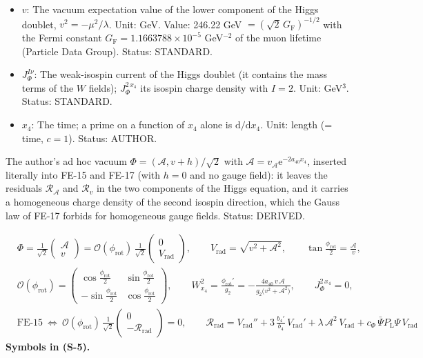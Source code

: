 \documentclass[
  10pt,
]{article}
\begin{document}
\begin{itemize}
\item
  \(v\): The vacuum expectation value of the lower component of the
  Higgs doublet, \(v^2 = -\mu^2/\lambda\). Unit: GeV. Value: 246.22 GeV
  \(= (\sqrt2\,G_{\mathrm{F}})^{-1/2}\) with the Fermi constant
  \(G_{\mathrm{F}} = 1.1663788\times10^{-5}\) GeV\(^{-2}\) of the muon
  lifetime (Particle Data Group). Status: STANDARD.
\item
  \(J_\Phi^{I\nu}\): The weak-isospin current of the Higgs doublet (it
  contains the mass terms of the \(W\) fields); \(J_\Phi^{2\,x_4}\) its
  isospin charge density with \(I = 2\). Unit: GeV\(^3\). Status:
  STANDARD.
\item
  \(x_4\): The time; a prime on a function of \(x_4\) alone is
  \(\mathrm{d}/\mathrm{d}x_4\). Unit: length (= time, \(c = 1\)).
  Status: AUTHOR.
\end{itemize}

The author's ad hoc vacuum \(\Phi = (\mathcal{A}, v + h)/\sqrt2\) with
\(\mathcal{A} = v_{\mathcal{A}}\mathrm{e}^{-2a_{40}x_4}\), inserted
literally into FE-15 and FE-17 (with \(h = 0\) and no gauge field): it
leaves the residuals \(\mathcal{R}_{\mathcal{A}}\) and \(\mathcal{R}_v\)
in the two components of the Higgs equation, and it carries a
homogeneous charge density of the second isospin direction, which the
Gauss law of FE-17 forbids for homogeneous gauge fields. Status:
DERIVED.

\[
\begin{aligned}
&\Phi = \frac{1}{\sqrt2}\begin{pmatrix}\mathcal{A}\\ v\end{pmatrix} = \mathcal{O}(\phi_{\mathrm{rot}})\,\frac{1}{\sqrt2}\begin{pmatrix}0\\ V_{\mathrm{rad}}\end{pmatrix},\qquad
 V_{\mathrm{rad}} = \sqrt{v^2 + \mathcal{A}^2},\qquad \tan\frac{\phi_{\mathrm{rot}}}{2} = \frac{\mathcal{A}}{v},\\
&\mathcal{O}(\phi_{\mathrm{rot}}) = \begin{pmatrix}\cos\frac{\phi_{\mathrm{rot}}}{2} & \sin\frac{\phi_{\mathrm{rot}}}{2}\\ -\sin\frac{\phi_{\mathrm{rot}}}{2} & \cos\frac{\phi_{\mathrm{rot}}}{2}\end{pmatrix},\qquad
 W^2_{x_4} = \frac{\phi_{\mathrm{rot}}'}{g_2} = -\frac{4a_{40}\,v\,\mathcal{A}}{g_2\big(v^2 + \mathcal{A}^2\big)},\qquad J_\Phi^{2\,x_4} = 0,\\
&\text{FE-15} \ \Leftrightarrow\ \mathcal{O}(\phi_{\mathrm{rot}})\,\frac{1}{\sqrt2}\begin{pmatrix}0\\ -\mathcal{R}_{\mathrm{rad}}\end{pmatrix} = 0,\qquad
 \mathcal{R}_{\mathrm{rad}} = V_{\mathrm{rad}}'' + 3\,\frac{b_4'}{b_4}\,V_{\mathrm{rad}}' + \lambda\,\mathcal{A}^2\,V_{\mathrm{rad}} + c_\Phi\,\bar\Psi P_{\mathrm{L}}\Psi\,V_{\mathrm{rad}}
\end{aligned} \tag{S-5}
\] \textbf{Symbols in (S-5).}
\end{document}
